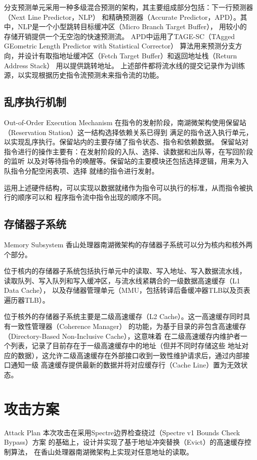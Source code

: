 分支预测单元采用一种多级混合预测的架构，其主要组成部分包括：下一行预测器（Next Line Predictor，NLP）
和精确预测器（Accurate Predictor，APD）。其中，NLP是一个小型跳转目标缓冲区（Micro Branch Target Buffer），
用较小的存储开销提供一个无空泡的快速预测流。
APD中运用了TAGE-SC（TAgged GEometric Length Predictor with Statistical Corrector）
算法用来预测分支方向，并设计有取指地址缓冲区（Fetch Target Buffer）和返回地址栈（Return Address Stack）
用以提供跳转地址。
上述部件都将流水线的提交记录作为训练源，以实现根据历史指令流预测未来指令流的功能。

\subsection{乱序执行机制}{Out-of-Order Execution Mechanism}
在指令的发射阶段，南湖微架构使用保留站（Reservation Station）这一结构选择依赖关系已得到
满足的指令送入执行单元，以实现乱序执行。保留站内的主要存储了指令状态、指令和依赖数据。
保留站对指令进行的操作主要有：在发射阶段的入队、选择、读数据和出队等，在写回阶段的监听
以及对等待指令的唤醒等。保留站的主要模块还包括选择逻辑，用来为入队指令分配空闲表项、选择
就绪的指令进行发射。

运用上述硬件结构，可以实现以数据就绪作为指令可以执行的标准，从而指令被执行的顺序可以和
程序指令流中指令出现的顺序不同。

\subsection{存储器子系统}{Memory Subsystem}
香山处理器南湖微架构的存储器子系统可以分为核内和核外两个部分。

位于核内的存储器子系统包括执行单元中的读取、写入地址、写入数据流水线，
读取队列、写入队列和写入缓冲区，与流水线紧耦合的一级数据高速缓存（L1 Data Cache），
以及存储器管理单元（MMU，包括转译后备缓冲器TLB以及页表遍历器TLB）。

位于核外的存储器子系统主要是二级高速缓存（L2 Cache）。这一高速缓存同时具有一致性管理器（Coherence Manager）
的功能，为基于目录的非包含高速缓存（Directory-Based Non-Inclusive Cache），这意味着
在二级高速缓存内维护者一个列表，记录了目前存在于一级高速缓存中的地址（但并不同时存储这些
地址对应的数据），这允许二级高速缓存在外部接口收到一致性维护请求后，通过内部接口通知一级
高速缓存提供最新的数据并将对应缓存行（Cache Line）置为无效状态。


\section{攻击方案}{Attack Plan} \label{sec:spectre}
本次攻击在采用Spectre边界检查绕过（Spectre v1 Bounds Check Bypass）\cite{kocher_spectre_2019}方案
的基础上，设计并实现了基于地址冲突替换（Evict）的高速缓存控制算法，
在香山处理器南湖微架构上实现对任意地址的读取。

